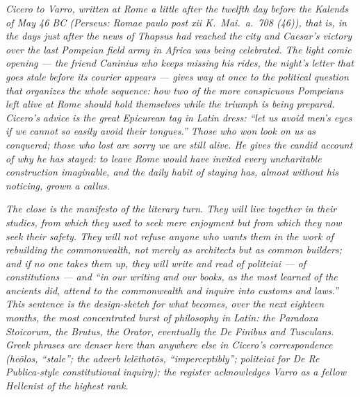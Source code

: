 
\textit{Cicero to Varro, written at Rome a little after the
twelfth day before the Kalends of May 46 BC (Perseus:
\textit{Romae paulo post xii K.~Mai.~a.~708 (46)}), that is, in
the days just after the news of Thapsus had reached the city
and Caesar's victory over the last Pompeian field army in Africa
was being celebrated. The light comic opening --- the friend
Caninius who keeps missing his rides, the night's letter that
goes stale before its courier appears --- gives way at once to
the political question that organizes the whole sequence: how
two of the more conspicuous Pompeians left alive at Rome should
hold themselves while the triumph is being prepared. Cicero's
advice is the great Epicurean tag in Latin dress: ``let us avoid
men's eyes if we cannot so easily avoid their tongues.'' Those
who won look on us as conquered; those who lost are sorry we are
still alive. He gives the candid account of why he has stayed:
to leave Rome would have invited every uncharitable construction
imaginable, and the daily habit of staying has, almost without
his noticing, grown a callus.}

\textit{The close is the manifesto of the literary turn. They
will live together in their studies, from which they used to
seek mere enjoyment but from which they now seek their safety.
They will not refuse anyone who wants them in the work of
rebuilding the commonwealth, not merely as architects but as
common builders; and if no one takes them up, they will write and
read of \textit{politeiai} --- of constitutions --- and ``in our
writing and our books, as the most learned of the ancients did,
attend to the commonwealth and inquire into customs and laws.''
This sentence is the design-sketch for what becomes, over the
next eighteen months, the most concentrated burst of philosophy
in Latin: the \textit{Paradoxa Stoicorum}, the \textit{Brutus},
the \textit{Orator}, eventually the \textit{De Finibus} and
\textit{Tusculans}. Greek phrases are denser here than anywhere
else in Cicero's correspondence (\textit{heōlos}, ``stale''; the
adverb \textit{lelēthotōs}, ``imperceptibly''; \textit{politeiai}
for \textit{De Re Publica}-style constitutional inquiry); the
register acknowledges Varro as a fellow Hellenist of the highest
rank.}
